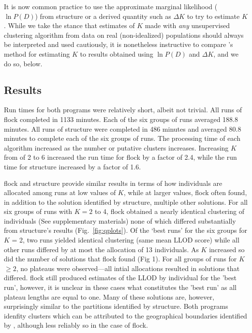 It is now common practice to use the approximate marginal likelihood ($\ln P(D)$) from {\sc structure}
or a derived quantity such as $\Delta K$ \citep{Evannoetal2005} to try to estimate $K$.
While we take the stance that estimates of $K$ made with {\em any} unsupervised clustering algorithm
from data on real (non-idealized) populations should always be interpreted and used
cautiously, it is nonetheless instructive to compare \citet{Duc&Tur2012}'s method for
estimating $K$ to results obtained using $\ln P(D)$ and $\Delta K$, and we do so, below. 


\subsection*{Results} 
Run times for both programs were relatively short, albeit not trivial. All runs of {\sc flock} 
completed in 1133 minutes. Each of the six groups of runs averaged 188.8 minutes.
All runs of {\sc structure} were completed in 
486 minutes and averaged 80.8 minutes to complete each of the six groups of runs.
The processing time of each algorithm increased as the number or 
putative clusters increases. Increasing
$K$ from of 2 to 6 increased the run time for {\sc flock} by a factor of 2.4, while the run time 
for {\sc structure} increased by a factor of 1.6.

{\sc flock} and {\sc structure} provide similar results in 
terms of how individuals are allocated among runs at low values of $K$, 
while at larger values, {\sc flock} often found, in addition to the solution identified by {\sc structure}, 
multiple other solutions. For all six groups 
of runs with $K = 2$ to 4, {\sc flock} obtained a nearly identical clustering of individuals 
(See supplementary materials) none of which differed substantially from {\sc structure}'s results
(Fig.~\ref{fig:qplots}). Of the `best runs' for the six groups for $K$ = 2, two  
runs yielded identical clustering (same mean LLOD score) while all other runs 
differed by at most the allocation of 13 individuals. As 
$K$ increased so did the number of solutions
that {\sc flock} found (Fig 1). For all groups of runs for $K$ $\geq 2$, no plateaus were observed---all intial 
allocations resulted in solutions that differed. 
{\sc flock} still produced estimates of the LLOD by individual for the 
'best run', however, it is unclear in these cases what constitutes the 'best run' as all plateau lengths are 
equal to one. Many of these solutions are, however, surprisingly similar to
the partitions identified by {\sc structure}. Both programs idenfity clusters 
which can be attributed to the geographical boundaries identified by \citet{Garzaetal_norcal},
although less reliably so in the case of {\sc flock}.

